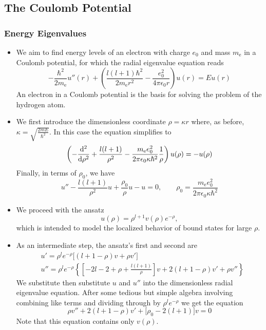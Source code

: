 \documentclass[11pt, a4paper]{article}
\begin{document}
\subsection{The Coulomb Potential}

\subsubsection{Energy Eigenvalues}
\begin{itemize}
	\item We aim to find energy levels of an electron with charge $ e_{0} $ and mass $ m_{\text{e}} $ in a Coulomb potential, for which the radial eigenvalue equation reads
	\begin{equation*}
		-\frac{\hbar^{2}}{2m_{\text{e}}}u''(r) + \left(\frac{l (l+1)\hbar^{2}}{2m_{\text{e}}r^{2}} - \frac{e_{0}^{2}}{4\pi \epsilon_{0}r}\right)u(r) = Eu(r)
	\end{equation*}
	An electron in a Coulomb potential is the basis for solving the problem of the hydrogen atom.
	
	\item We first introduce the dimensionless coordinate $ \rho = \kappa r $ where, as before, $ \kappa = \sqrt{\frac{2mE}{\hbar^{2}}} $. In this case the equation simplifies to 
	\begin{equation*}
		\left(-\dv[2]{}{\rho} + \frac{l (l+1)}{\rho^{2}} - \frac{m_{\text{e}}e_{0}^{2}}{2\pi \epsilon_{0} \kappa \hbar^{2}}\frac{1}{\rho}\right)u(\rho) = - u(\rho)
	\end{equation*}
	Finally, in terms of $ \rho_{0} $, we have
	\begin{equation*}
		u'' - \frac{l \left(l+1\right)}{\rho^{2}}u + \frac{\rho_{0}}{\rho}u - u = 0, \qquad \rho_{0} = \frac{m_{\text{e}}e_{0}^{2}}{2\pi \epsilon_{0}\kappa \hbar^{2}}
	\end{equation*}
	
	\item We proceed with the ansatz
	\begin{equation*}
		u(\rho) = \rho^{l + 1}v(\rho)e^{-\rho},
	\end{equation*}
	which is intended to model the localized behavior of bound states for large $ \rho $. 
	
	\item As an intermediate step, the ansatz's first and second are
	\begin{align*}
		& u' = \rho^{l}e^{-\rho} \big[(l+1-\rho)v + \rho v'\big]\\
		& u'' = \rho^{l}e^{-\rho}\left\{\left[-2l -2 + \rho + \frac{l (l+1)}{\rho}\right]v + 2(l + 1 - \rho)v' + \rho v''\right\}
	\end{align*}
	We substitute then substitute $ u $ and $ u'' $ into the dimensionless radial eigenvalue equation. After some tedious but simple algebra involving combining like terms and dividing through by $ \rho^{l}e^{-\rho} $ we get the equation
	\begin{equation*}
		\rho v'' + 2(l + 1 - \rho)v' + \big[\rho_{0} - 2(l+1)\big]v = 0
	\end{equation*}
	Note that this equation contains only $ v(\rho) $. 
	

\end{itemize}
\end{document}
